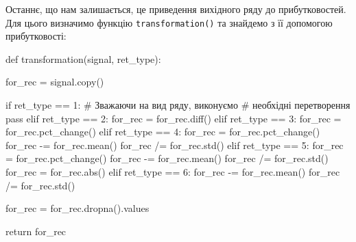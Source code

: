 \documentclass[
  letterpaper,
]{report}
\newenvironment{Shaded}{\begin{snugshade}}{\end{snugshade}}
\newcommand{\BuiltInTok}[1]{\textcolor[rgb]{0.00,0.23,0.31}{#1}}
\newcommand{\CommentTok}[1]{\textcolor[rgb]{0.37,0.37,0.37}{#1}}
\newcommand{\ControlFlowTok}[1]{\textcolor[rgb]{0.00,0.23,0.31}{#1}}
\newcommand{\DecValTok}[1]{\textcolor[rgb]{0.68,0.00,0.00}{#1}}
\newcommand{\KeywordTok}[1]{\textcolor[rgb]{0.00,0.23,0.31}{#1}}
\newcommand{\NormalTok}[1]{\textcolor[rgb]{0.00,0.23,0.31}{#1}}
\newcommand{\OperatorTok}[1]{\textcolor[rgb]{0.37,0.37,0.37}{#1}}
\begin{document}
Останнє, що нам залишається, це приведення вихідного ряду до
прибутковостей. Для цього визначимо функцію \texttt{transformation()} та
знайдемо з її допомогою прибутковості:

\begin{Shaded}
\begin{Highlighting}[]
\KeywordTok{def}\NormalTok{ transformation(signal, ret\_type):}

\NormalTok{    for\_rec }\OperatorTok{=}\NormalTok{ signal.copy()}

    \ControlFlowTok{if}\NormalTok{ ret\_type }\OperatorTok{==} \DecValTok{1}\NormalTok{:       }\CommentTok{\# Зважаючи на вид ряду, виконуємо}
                            \CommentTok{\# необхідні перетворення}
        \ControlFlowTok{pass}
    \ControlFlowTok{elif}\NormalTok{ ret\_type }\OperatorTok{==} \DecValTok{2}\NormalTok{:}
\NormalTok{        for\_rec }\OperatorTok{=}\NormalTok{ for\_rec.diff()}
    \ControlFlowTok{elif}\NormalTok{ ret\_type }\OperatorTok{==} \DecValTok{3}\NormalTok{:}
\NormalTok{        for\_rec }\OperatorTok{=}\NormalTok{ for\_rec.pct\_change()}
    \ControlFlowTok{elif}\NormalTok{ ret\_type }\OperatorTok{==} \DecValTok{4}\NormalTok{:}
\NormalTok{        for\_rec }\OperatorTok{=}\NormalTok{ for\_rec.pct\_change()}
\NormalTok{        for\_rec }\OperatorTok{{-}=}\NormalTok{ for\_rec.mean()}
\NormalTok{        for\_rec }\OperatorTok{/=}\NormalTok{ for\_rec.std()}
    \ControlFlowTok{elif}\NormalTok{ ret\_type }\OperatorTok{==} \DecValTok{5}\NormalTok{: }
\NormalTok{        for\_rec }\OperatorTok{=}\NormalTok{ for\_rec.pct\_change()}
\NormalTok{        for\_rec }\OperatorTok{{-}=}\NormalTok{ for\_rec.mean()}
\NormalTok{        for\_rec }\OperatorTok{/=}\NormalTok{ for\_rec.std()}
\NormalTok{        for\_rec }\OperatorTok{=}\NormalTok{ for\_rec.}\BuiltInTok{abs}\NormalTok{()}
    \ControlFlowTok{elif}\NormalTok{ ret\_type }\OperatorTok{==} \DecValTok{6}\NormalTok{:}
\NormalTok{        for\_rec }\OperatorTok{{-}=}\NormalTok{ for\_rec.mean()}
\NormalTok{        for\_rec }\OperatorTok{/=}\NormalTok{ for\_rec.std()}

\NormalTok{    for\_rec }\OperatorTok{=}\NormalTok{ for\_rec.dropna().values}

    \ControlFlowTok{return}\NormalTok{ for\_rec}
\end{Highlighting}
\end{Shaded}
\end{document}

